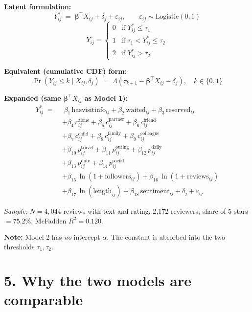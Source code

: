 \documentclass[11pt,a4paper]{article}
\newcommand{\prob}{\operatorname{Pr}}
\begin{document}
\textbf{Latent formulation:}
\[
Y^{*}_{ij} \;=\; \bm{\beta}^{\top} X_{ij} + \delta_j + \varepsilon_{ij},
\qquad \varepsilon_{ij} \sim \text{Logistic}(0, 1)
\]
\[
Y_{ij} =
\begin{cases}
0 & \text{if } Y^{*}_{ij} \leq \tau_{1} \\
1 & \text{if } \tau_{1} < Y^{*}_{ij} \leq \tau_{2} \\
2 & \text{if } Y^{*}_{ij} > \tau_{2}
\end{cases}
\]

\textbf{Equivalent (cumulative CDF) form:}
\[
\prob(Y_{ij} \leq k \mid X_{ij}, \delta_j)
   \;=\; \Lambda\!\left(\tau_{k+1} - \bm{\beta}^{\top} X_{ij} - \delta_j\right),
   \quad k \in \{0, 1\}
\]

\textbf{Expanded (same $\bm{\beta}^{\top} X_{ij}$ as Model 1):}
\begin{align*}
Y^{*}_{ij} \;=\; &\; \beta_{1}\,\text{hasvisitinfo}_{ij}
                  + \beta_{2}\,\text{waited}_{ij}
                  + \beta_{3}\,\text{reserved}_{ij} \\
   &+ \beta_{4}\,c^{\mathrm{alone}}_{ij}
    + \beta_{5}\,c^{\mathrm{partner}}_{ij}
    + \beta_{6}\,c^{\mathrm{friend}}_{ij} \\
   &+ \beta_{7}\,c^{\mathrm{child}}_{ij}
    + \beta_{8}\,c^{\mathrm{family}}_{ij}
    + \beta_{9}\,c^{\mathrm{colleague}}_{ij} \\
   &+ \beta_{10}\,p^{\mathrm{travel}}_{ij}
    + \beta_{11}\,p^{\mathrm{outing}}_{ij}
    + \beta_{12}\,p^{\mathrm{daily}}_{ij} \\
   &+ \beta_{13}\,p^{\mathrm{date}}_{ij}
    + \beta_{14}\,p^{\mathrm{social}}_{ij} \\
   &+ \beta_{15}\,\ln(1 + \text{followers}_{ij})
    + \beta_{16}\,\ln(1 + \text{reviews}_{ij}) \\
   &+ \beta_{17}\,\ln(\text{length}_{ij})
    + \beta_{18}\,\text{sentiment}_{ij}
    + \delta_j + \varepsilon_{ij}
\end{align*}

\textit{Sample:} $N = 4{,}044$ reviews with text and rating, 2{,}172 reviewers;
share of 5 stars $= 75.2\%$; McFadden $R^2 = 0.120$.

\textbf{Note:} Model 2 has \emph{no} intercept $\alpha$. The constant is absorbed
into the two thresholds $\tau_1, \tau_2$.

\hrulefill

\section*{5. Why the two models are comparable}
\end{document}
